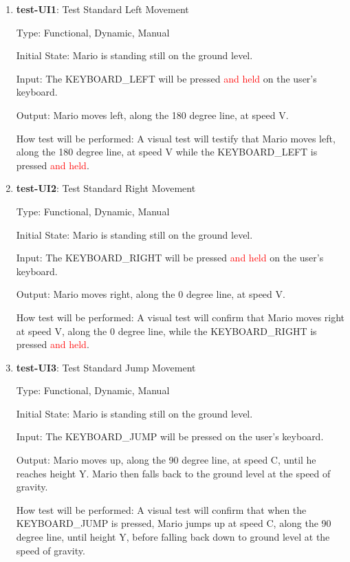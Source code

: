 \documentclass[12pt, titlepage]{article}
\begin{document}
\begin{enumerate}

\item{\textbf{test-UI1}: Test Standard Left Movement\\}

Type: Functional, Dynamic, Manual

Initial State: Mario is standing still on the ground level.

Input: The KEYBOARD\_LEFT will be pressed \textcolor{red}{and held} on the user's keyboard.

Output: Mario moves left, along the 180 degree line, at speed V.

How test will be performed: A visual test will testify that Mario moves left, along the 180 degree line, at speed V while the KEYBOARD\_LEFT is pressed \textcolor{red}{and held}.

\item{\textbf{test-UI2}: Test Standard Right Movement\\}

Type: Functional, Dynamic, Manual

Initial State: Mario is standing still on the ground level.

Input: The KEYBOARD\_RIGHT will be pressed \textcolor{red}{and held} on the user's keyboard.

Output: Mario moves right, along the 0 degree line, at speed V.

How test will be performed: A visual test will confirm that Mario moves right at speed V, along the 0 degree line, while the KEYBOARD\_RIGHT is pressed \textcolor{red}{and held}.

\item{\textbf{test-UI3}: Test Standard Jump Movement\\}

Type: Functional, Dynamic, Manual

Initial State: Mario is standing still on the ground level.

Input: The KEYBOARD\_JUMP will be pressed on the user's keyboard.

Output: Mario moves up, along the 90 degree line, at speed C, until he reaches height Y. Mario then falls back to the ground level at the speed of gravity.

How test will be performed: A visual test will confirm that when the KEYBOARD\_JUMP is pressed, Mario jumps up at speed C, along the 90 degree line, until height Y, before falling back down to ground level at the speed of gravity.


\end{enumerate}
\end{document}
